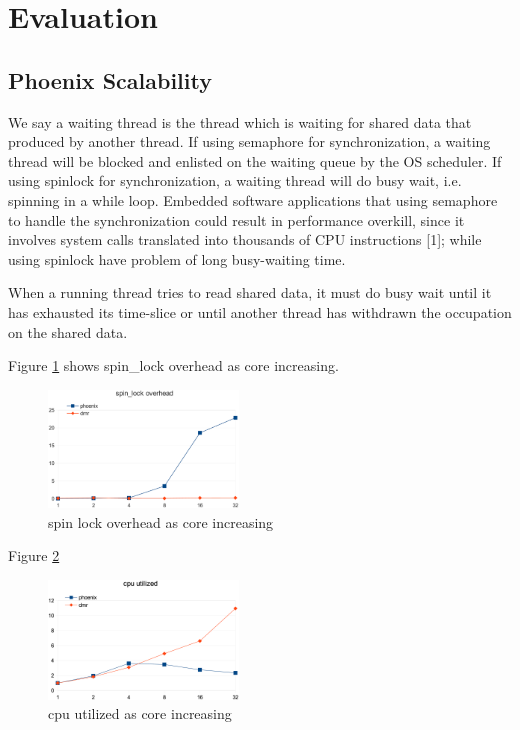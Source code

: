 \section{Evaluation}

\subsection{Phoenix Scalability}
We say a
waiting thread is the thread which is waiting for shared
data that produced by another thread. If using semaphore for
synchronization, a waiting thread will be blocked and enlisted
on the waiting queue by the OS scheduler. If using spinlock
for synchronization, a waiting thread will do busy wait, i.e.
spinning in a while loop. Embedded software applications
that using semaphore to handle the synchronization could
result in performance overkill, since it involves system calls
translated into thousands of CPU instructions [1]; while using
spinlock have problem of long busy-waiting time.

When a running thread tries to read shared data,
it must do busy wait until it has exhausted its time-slice
or until another thread has withdrawn the occupation on the
shared data. 


Figure \ref{fig:perf:spinlock} shows spin\_lock overhead
as core increasing.
\begin{figure}[!h!t]  
    \centering
    \includegraphics[width=0.45\textwidth]{eps/perf_spinlock.eps}
    \caption{spin lock overhead as core increasing}
    \label{fig:perf:spinlock}
\end{figure}

Figure \ref{fig:perf:utilized}
\begin{figure}[!h!t]  
    \centering
    \includegraphics[width=0.45\textwidth]{eps/perf_utilized.eps}
    \caption{cpu utilized as core increasing}
    \label{fig:perf:utilized}
\end{figure}


